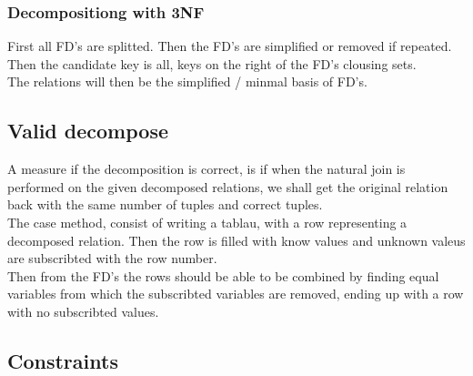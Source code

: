\documentclass[12pt, a4paper]{article}
\begin{document}
			\subsubsection{Decompositiong with 3NF}
				First all FD's are splitted. Then the FD's are simplified or removed if repeated.\\
				Then the candidate key is all, keys on the right of the FD's clousing sets.\\
				The relations will then be the simplified / minmal basis of FD's.
		\subsection{Valid decompose}
			A measure if the decomposition is correct, is if when the natural join is performed on the given decomposed relations, we shall get the original relation back with the same number of tuples and correct tuples.\\
			The case method, consist of writing a tablau, with a row representing a decomposed relation. Then the row is filled with know values and unknown valeus are subscribted with the row number.\\
			Then from the FD's the rows should be able to be combined by finding equal variables from which the subscribted variables are removed, ending up with a row with no subscribted values.
		\subsection{Constraints}
\end{document}

